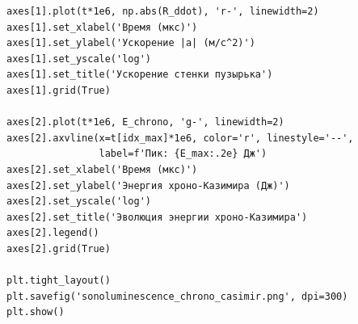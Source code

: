\documentclass[12pt,a4paper]{article}
\begin{document}
\begin{verbatim}
axes[1].plot(t*1e6, np.abs(R_ddot), 'r-', linewidth=2)
axes[1].set_xlabel('Время (мкс)')
axes[1].set_ylabel('Ускорение |a| (м/с^2)')
axes[1].set_yscale('log')
axes[1].set_title('Ускорение стенки пузырька')
axes[1].grid(True)

axes[2].plot(t*1e6, E_chrono, 'g-', linewidth=2)
axes[2].axvline(x=t[idx_max]*1e6, color='r', linestyle='--', 
                label=f'Пик: {E_max:.2e} Дж')
axes[2].set_xlabel('Время (мкс)')
axes[2].set_ylabel('Энергия хроно-Казимира (Дж)')
axes[2].set_yscale('log')
axes[2].set_title('Эволюция энергии хроно-Казимира')
axes[2].legend()
axes[2].grid(True)

plt.tight_layout()
plt.savefig('sonoluminescence_chrono_casimir.png', dpi=300)
plt.show()
\end{verbatim}
\end{document}
